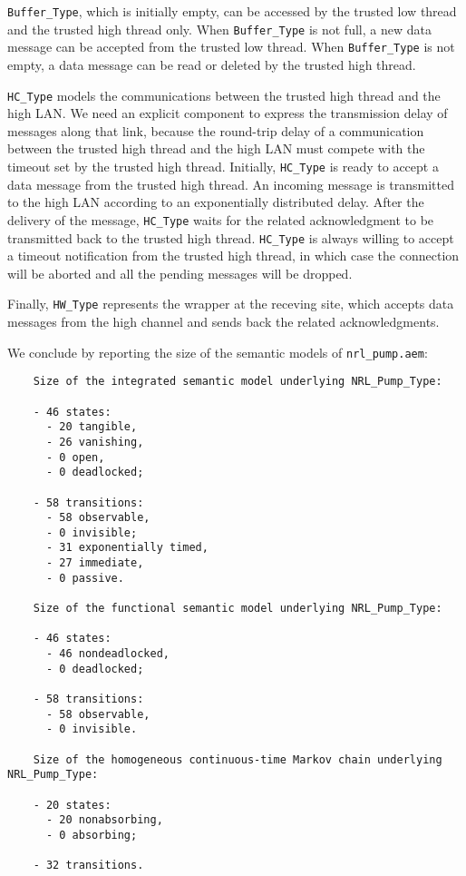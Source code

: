 {\tt Buffer\_Type}, which is initially empty, can be accessed by the trusted low thread and the trusted high
thread only. When {\tt Buffer\_Type} is not full, a new data message can be accepted from the trusted low
thread. When {\tt Buffer\_Type} is not empty, a data message can be read or deleted by the trusted high
thread.

{\tt HC\_Type} models the communications between the trusted high thread and the high LAN. We need an
explicit component to express the transmission delay of messages along that link, because the round-trip
delay of a communication between the trusted high thread and the high LAN must compete with the timeout set
by the trusted high thread. Initially, {\tt HC\_Type} is ready to accept a data message from the trusted
high thread. An incoming message is transmitted to the high LAN according to an exponentially distributed
delay. After the delivery of the message, {\tt HC\_Type} waits for the related acknowledgment to be
transmitted back to the trusted high thread. {\tt HC\_Type} is always willing to accept a timeout
notification from the trusted high thread, in which case the connection will be aborted and all the pending
messages will be dropped.

Finally, {\tt HW\_Type} represents the wrapper at the receving site, which accepts data messages from the
high channel and sends back the related acknowledgments.

We conclude by reporting the size of the semantic models of {\tt nrl\_pump.aem}:

	\begin{verbatim}
    Size of the integrated semantic model underlying NRL_Pump_Type:

    - 46 states: 
      - 20 tangible, 
      - 26 vanishing, 
      - 0 open, 
      - 0 deadlocked;

    - 58 transitions:
      - 58 observable,
      - 0 invisible;
      - 31 exponentially timed,
      - 27 immediate,
      - 0 passive.

    Size of the functional semantic model underlying NRL_Pump_Type:

    - 46 states: 
      - 46 nondeadlocked, 
      - 0 deadlocked;

    - 58 transitions:
      - 58 observable,
      - 0 invisible.

    Size of the homogeneous continuous-time Markov chain underlying NRL_Pump_Type:

    - 20 states: 
      - 20 nonabsorbing, 
      - 0 absorbing;

    - 32 transitions.
	\end{verbatim}



